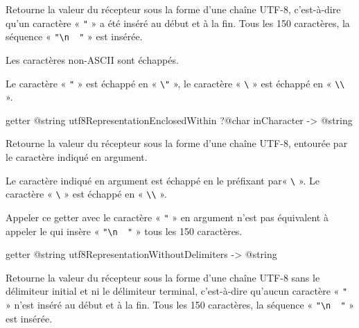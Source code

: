 Retourne la valeur du récepteur sous la forme d'une chaîne UTF-8, c'est-à-dire qu'un caractère « \texttt{"} » a été inséré au début et à la fin. Tous les 150 caractères, la séquence « \texttt{"\textbackslash n~~"} » est insérée.

Les caractères non-ASCII sont échappés.

Le caractère « \texttt{"} » est échappé en « \texttt{\textbackslash"} », le caractère « \texttt{\textbackslash} » est échappé en « \texttt{\textbackslash\textbackslash} ».










\begin{galgasbox}
getter @string utf8RepresentationEnclosedWithin ?@char inCharacter -> @string
\end{galgasbox}

Retourne la valeur du récepteur sous la forme d'une chaîne UTF-8, entourée par le caractère indiqué en argument.

Le caractère indiqué en argument est échappé en le préfixant par« \texttt{\textbackslash} ». Le caractère « \texttt{\textbackslash} » est échappé en « \texttt{\textbackslash\textbackslash} ».

Appeler ce getter avec le caractère « \texttt{"} » en argument n'est pas équivalent à appeler le  qui insère  « \texttt{"\textbackslash n~~"} » tous les 150 caractères.









\begin{galgasbox}
getter @string utf8RepresentationWithoutDelimiters -> @string
\end{galgasbox}

Retourne la valeur du récepteur sous la forme d'une chaîne UTF-8 sans le délimiteur initial et ni le délimiteur terminal, c'est-à-dire qu'aucun caractère « \texttt{"} » n'est inséré au début et à la fin. Tous les 150 caractères, la séquence « \texttt{"\textbackslash n~~"} » est insérée.














